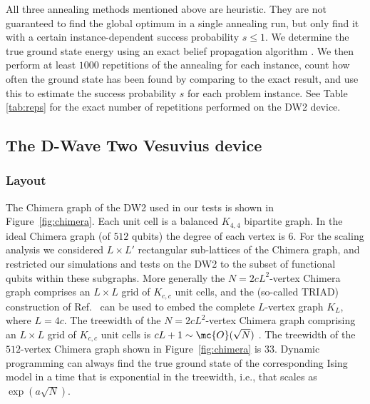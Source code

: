 All three annealing methods mentioned above are heuristic. They are not guaranteed to find the global optimum in a single annealing run, but only find it with a certain instance-dependent success probability $s\leq 1$. We determine the true ground state energy using an exact belief propagation algorithm \cite{dechter1999bucket}. We then perform at least $1000$ repetitions of the annealing for each instance, count how often the ground state has been found by comparing to the exact result, and use this to estimate the success probability $s$ for each problem instance. See Table \ref{tab:reps} for the exact number of repetitions performed on the DW2 device. \\


\subsection{The D-Wave Two Vesuvius device}
\subsubsection{Layout}
%
The Chimera graph of the DW2 used in our tests is shown in Figure~\ref{fig:chimera}. Each unit cell is a balanced $K_{4,4}$ bipartite graph. In the ideal Chimera graph (of $512$ qubits) the degree of each vertex is $6$.
For the scaling analysis we considered $L\times  L'$ rectangular sub-lattices of the Chimera graph, and restricted our simulations and tests on the DW2 to the subset of functional qubits within these subgraphs.
More generally the $N=2cL^2$-vertex Chimera graph comprises an $L\times L$ grid of $K_{c,c}$ unit cells, and the (so-called {\sc TRIAD}) construction of Ref.~\cite{Choi2} can be used to embed the complete $L$-vertex graph $K_L$, where $L=4c$.
The treewidth of the $N=2cL^2$-vertex Chimera graph comprising an $L\times L$ grid of $K_{c,c}$ unit cells is $cL+1 \sim \mc{O}(\sqrt{N})$ \cite{Choi2}. The treewidth of the $512$-vertex Chimera graph shown in Figure~\ref{fig:chimera} is $33$. Dynamic programming can always find the true ground state of the corresponding Ising model in a time that is exponential in the treewidth, i.e., that scales as $\exp(a\sqrt{N})$.\\

